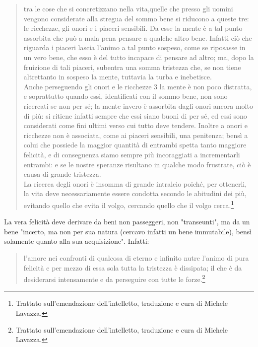 \begin{quotation}
	\small tra le cose che si concretizzano nella vita,quelle che presso gli uomini vengono
	considerate alla stregua del sommo bene si riducono a queste tre: le ricchezze, gli onori e i piaceri
	sensibili. Da esse la mente è a tal punto assorbita che può a mala pena pensare a qualche altro bene. Infatti ciò che riguarda i piaceri lascia l'animo a tal punto sospeso, come se riposasse in un vero
	bene, che esso è del tutto incapace di pensare ad altro; ma, dopo la fruizione di tali piaceri, subentra
	una somma tristezza che, se non tiene altrettanto in sospeso la mente, tuttavia la turba e inebetisce.\\
	Anche perseguendo gli onori e le ricchezze 3 la mente è non poco distratta, e soprattutto
	quando essi, identificati con il sommo bene, non sono ricercati se non per sé; la mente invero è
	assorbita dagli onori ancora molto di più: si ritiene infatti sempre che essi siano buoni di per sé, ed
	essi sono considerati come fini ultimi verso cui tutto deve tendere. Inoltre a onori e ricchezze non è
	associata, come ai piaceri sensibili, una penitenza; bensì a colui che possiede la maggior quantità di
	entrambi spetta tanto maggiore felicità, e di conseguenza siamo sempre più incoraggiati a
	incrementarli entrambi: e se le nostre speranze risultano in qualche modo frustrate, ciò è causa di
	grande tristezza.\\
	La ricerca degli onori è insomma di grande intralcio poiché, per ottenerli, la vita deve necessariamente essere condotta secondo le abitudini dei più, evitando quello che evita il volgo,
	cercando quello che il volgo cerca.\footnote{Trattato sull'emendazione dell'intelletto, traduzione e cura di Michele Lavazza.}
\end{quotation}

La vera felicità deve derivare da beni non passeggeri, non "transeunti", ma da un bene "incerto, ma non per sua natura (cercavo infatti
un bene immutabile), bensì solamente quanto alla sua acquisizione". Infatti: 

\begin{quotation}
	\small l'amore nei confronti di qualcosa di eterno e infinito nutre l'animo di pura felicità e per mezzo di
	essa sola tutta la tristezza è dissipata; il che è da desiderarsi intensamente e da perseguire con tutte
	le forze.\footnote{Trattato sull'emendazione dell'intelletto, traduzione e cura di Michele Lavazza.}
\end{quotation}

